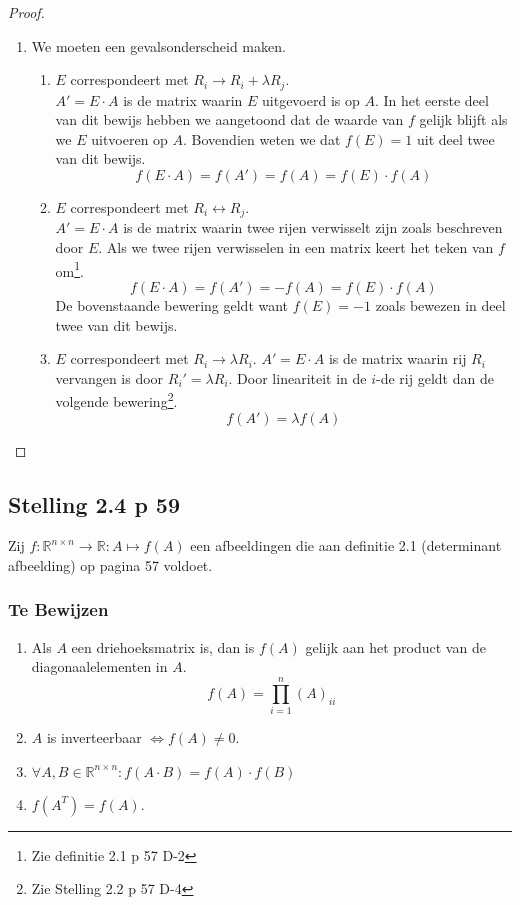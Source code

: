\documentclass[lineaire_algebra_oplossingen.tex]{subfiles}
\begin{document}
\begin{proof}
\begin{enumerate}
\item
We moeten een gevalsonderscheid maken.
\begin{enumerate}
\item $E$ correspondeert met  $R_i \rightarrow R_i + \lambda R_j$.\\
$A' = E\cdot A$ is de matrix waarin $E$ uitgevoerd is op $A$. In het eerste deel van dit bewijs hebben we aangetoond dat de waarde van $f$ gelijk blijft als we $E$ uitvoeren op $A$. Bovendien weten we dat $f(E)=1$ uit deel twee van dit bewijs.
\[
f(E\cdot A) = f(A') = f(A) = f(E)\cdot f(A)
\]
\item $E$ correspondeert met  $R_i \leftrightarrow R_j$.\\
$A' = E\cdot A$ is de matrix waarin twee rijen verwisselt zijn zoals beschreven door $E$. Als we twee rijen verwisselen in een matrix keert het teken van $f$ om\footnote{Zie definitie 2.1 p 57 D-2}.
\[
f(E\cdot A) = f(A') = -f(A) = f(E)\cdot f(A)
\]
De bovenstaande bewering geldt want $f(E) = -1$ zoals bewezen in deel twee van dit bewijs.
\item $E$ correspondeert met $R_i \rightarrow \lambda R_i$.
$A' = E\cdot A$ is de matrix waarin rij $R_i$ vervangen is door $R_i' = \lambda R_i$. Door lineariteit in de $i$-de rij geldt dan de volgende bewering\footnote{Zie Stelling 2.2 p 57 D-4}.
\[
f(A') = \lambda f(A)
\]
\end{enumerate}
\end{enumerate}
\end{proof}


\subsection{Stelling 2.4 p 59}
\label{2.4}
Zij $f : \mathbb{R}^{n\times n} \rightarrow \mathbb{R}:A\mapsto f(A)$ een afbeeldingen die aan definitie 2.1 (determinant afbeelding) op pagina 57 voldoet.

\subsubsection*{Te Bewijzen}
\begin{enumerate}
\item Als $A$ een driehoeksmatrix is, dan is $f(A)$ gelijk aan het product van de diagonaalelementen in $A$.
\[
f(A) = \prod_{i=1}^n (A)_{ii}
\]
\item $A$ is inverteerbaar $\Leftrightarrow f(A) \neq 0$.
\item $\forall A,B \in \mathbb{R}^{n\times n}: f(A\cdot B) = f(A)\cdot f(B)$
\item $f(A^T) = f(A)$.
\end{enumerate}
\end{document}
